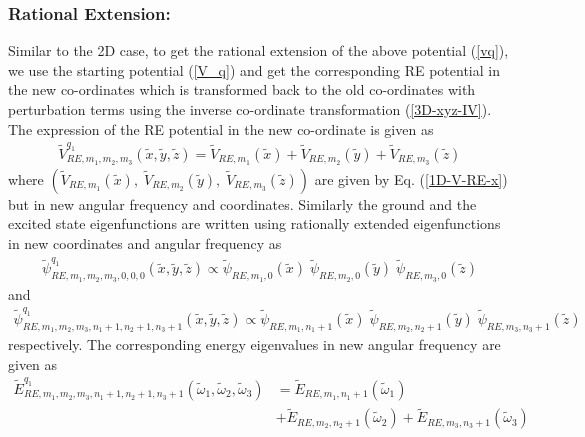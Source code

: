 \documentclass[a4paper, 12pt]{article}
\newcommand{\td}[1]{\tilde{#1}}
\begin{document}
\subsubsection*{Rational Extension:}

Similar to the 2D case, to get the rational extension of the above potential (\ref{vq}), we use the starting potential (\ref{V_q}) and get the corresponding RE potential in the new co-ordinates which is transformed back to  the old co-ordinates with perturbation terms using the inverse co-ordinate transformation (\ref{3D-xyz-IV}). The expression of the RE potential in the new co-ordinate is given as 
\begin{align}
	\td{V}^{q_1}_{RE,m_1,m_2,m_3}(\td{x},\td{y},\td{z})= \td{V}_{RE,m_1}(\td{x})+\td{V}_{RE,m_2}(\td{y})+\td{V}_{RE,m_3}(\td{z})
\end{align}
where $(\td{V}_{RE,m_1}(\td{x}),\;\td{V}_{RE,m_2}(\td{y}),\;\td{V}_{RE,m_3}(\td{z}))$ are given by Eq. (\ref{1D-V-RE-x}) but in new angular frequency and coordinates. Similarly the ground and the excited state eigenfunctions are written using rationally extended eigenfunctions in new coordinates and angular frequency as
\begin{align}\nonumber
	\td{\psi}^{q_1}_{RE,m_1,m_2,m_3,0,0,0}(\td{x},\td{y},\td{z})\propto \td{\psi}_{RE,m_1,0}(\td{x})\;
  \td{\psi}_{RE,m_2,0}(\td{y})\; \td{\psi}_{RE,m_3,0}(\td{z})
\end{align}
and 
\begin{align}
	\td{\psi}^{q_1}_{RE,m_1,m_2,m_3,n_1+1,n_2+1,n_3+1}(\td{x},\td{y},\td{z})\propto \td{\psi}_{RE,m_1,n_1+1}(\td{x})\;
  \td{\psi}_{RE,m_2,n_2+1}(\td{y})\; \td{\psi}_{RE,m_3,n_3+1}(\td{z})
\end{align}
respectively. The corresponding energy eigenvalues in new angular frequency are given as
\begin{align}\nonumber
	\td{E}^{q_1}_{RE,m_1,m_2,m_3,n_1+1,n_2+1,n_3+1}(\td{\omega}_1,\td{\omega}_2,\td{\omega}_3)&=\td{E}_{RE,m_1,n_1+1}\left(\td{\omega}_1\right)\\
	&+\td{E}_{RE,m_2,n_2+1}\left(\td{\omega}_2\right)+\td{E}_{RE,m_3,n_3+1}\left(\td{\omega}_3\right)
\end{align}
\end{document}
